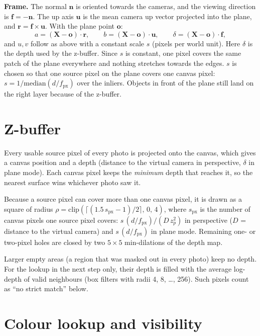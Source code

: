 \documentclass[11pt, a4paper]{article}
\newcommand{\X}{\mathbf{X}}
\begin{document}
\textbf{Frame.} The normal $\mathbf{n}$ is oriented towards the cameras, and the viewing direction is $\mathbf{f} = -\mathbf{n}$.
The up axis $\mathbf{u}$ is the mean camera up vector projected into the plane, and $\mathbf{r} = \mathbf{f}\times\mathbf{u}$.
With the plane point $\mathbf{o}$:
\begin{equation}
  a = (\X-\mathbf{o})\cdot\mathbf{r}, \qquad b = (\X-\mathbf{o})\cdot\mathbf{u}, \qquad \delta = (\X-\mathbf{o})\cdot\mathbf{f},
\end{equation}
and $u, v$ follow as above with a constant scale $s$ (pixels per world unit). Here $\delta$ is the depth used by the
z-buffer. Since $s$ is constant, one pixel covers the same patch of the plane everywhere and nothing stretches towards the edges.
$s$ is chosen so that one source pixel on the plane covers one canvas pixel: $s = 1/\mathrm{median}(d/f_{\mathrm{px}})$ over the inliers.
Objects in front of the plane still land on the right layer because of the z-buffer.

\section{Z-buffer}

Every usable source pixel of every photo is projected onto the canvas, which gives a canvas position and a depth
(distance to the virtual camera in perspective, $\delta$ in plane mode). Each canvas pixel keeps the \emph{minimum} depth
that reaches it, so the nearest surface wins whichever photo saw it.

Because a source pixel can cover more than one canvas pixel, it is drawn as a square of radius
$\rho = \mathrm{clip}\!\left(\lceil (1.5\,s_{\mathrm{px}} - 1)/2 \rceil,\,0,\,4\right)$, where $s_{\mathrm{px}}$ is the number of canvas pixels one
source pixel covers: $s\,(d/f_{\mathrm{px}})/(D\,z_p^2)$ in perspective ($D$ = distance to the virtual camera) and $s\,(d/f_{\mathrm{px}})$ in plane mode.
Remaining one- or two-pixel holes are closed by two $5\times5$ min-dilations of the depth map.

Larger empty areas (a region that was masked out in every photo) keep no depth. For the lookup in the next step only, their depth is filled
with the average log-depth of valid neighbours (box filters with radii 4, 8, \dots, 256). Such pixels count as ``no strict match''
below.

\section{Colour lookup and visibility}
\end{document}
